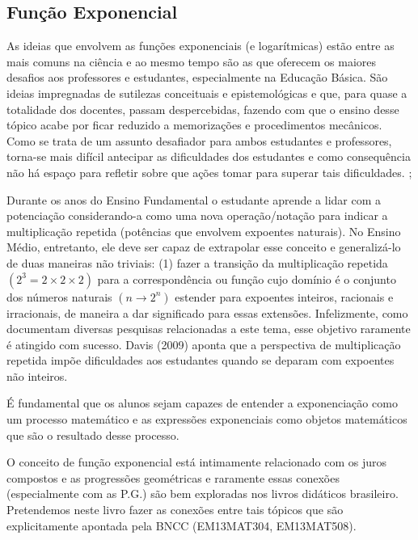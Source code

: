 \begin{apresentacao}
\section{Função Exponencial}

As ideias que envolvem as funções exponenciais (e logarítmicas) estão entre as mais comuns na ciência e ao mesmo tempo são as que oferecem os maiores desafios aos professores e estudantes, especialmente na Educação Básica. São ideias impregnadas de sutilezas conceituais e epistemológicas e que, para quase a totalidade dos docentes, passam despercebidas, fazendo com que o ensino desse tópico acabe por ficar reduzido a memorizações e procedimentos mecânicos. Como se trata de um assunto desafiador para ambos estudantes e professores, torna-se mais difícil antecipar as dificuldades dos estudantes e como consequência não há espaço para refletir sobre que ações tomar para superar tais dificuldades. \citep{Davis2009}; \citep{Weber2002}

Durante os anos do Ensino Fundamental o estudante aprende a lidar com a potenciação considerando-a como uma nova operação/notação para indicar a multiplicação repetida (potências que envolvem expoentes naturais). No Ensino Médio, entretanto, ele deve ser capaz de extrapolar esse conceito e generalizá-lo de duas maneiras não triviais: (1) fazer a transição da multiplicação repetida $(2^{3}=2 \times 2 \times 2 )$ para a correspondência ou função cujo domínio é o conjunto dos números naturais $(n \longrightarrow 2^{n})$ estender para expoentes inteiros, racionais e irracionais, de maneira a dar significado para essas extensões. Infelizmente, como documentam diversas pesquisas relacionadas a este tema, esse objetivo raramente é atingido com sucesso.  Davis (2009) aponta que a perspectiva de multiplicação repetida impõe dificuldades aos estudantes quando se deparam com expoentes não inteiros.

É fundamental que os alunos sejam capazes de entender a exponenciação como um processo matemático e as expressões exponenciais como objetos matemáticos que são o resultado desse processo. \citep{Weber2002}

O conceito de função exponencial está intimamente relacionado com os juros compostos e as progressões geométricas e raramente essas conexões (especialmente com as P.G.) são bem exploradas nos livros didáticos brasileiro. Pretendemos neste livro fazer as conexões entre tais tópicos que são explicitamente apontada pela BNCC \citep{BNCC2018} (EM13MAT304, EM13MAT508). 


\end{apresentacao}
